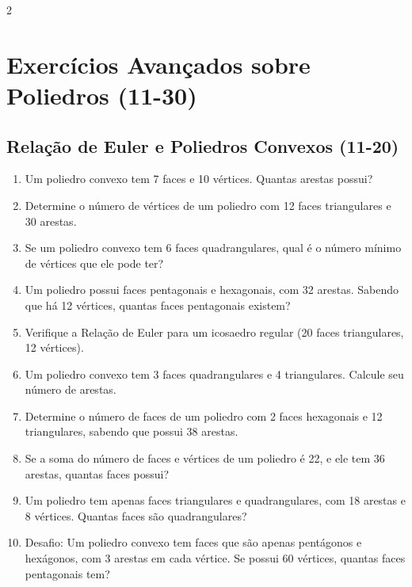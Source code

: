 \documentclass[11pt]{article}
\begin{document}
\begin{multicols}{2}
\section*{Exercícios Avançados sobre Poliedros (11-30)}

\subsection*{Relação de Euler e Poliedros Convexos (11-20)}
\begin{enumerate}
    \item Um poliedro convexo tem 7 faces e 10 vértices. Quantas arestas possui?
    
    \item Determine o número de vértices de um poliedro com 12 faces triangulares e 30 arestas.
    
    \item Se um poliedro convexo tem 6 faces quadrangulares, qual é o número mínimo de vértices que ele pode ter?
    
    \item Um poliedro possui faces pentagonais e hexagonais, com 32 arestas. Sabendo que há 12 vértices, quantas faces pentagonais existem?
    
    \item Verifique a Relação de Euler para um icosaedro regular (20 faces triangulares, 12 vértices).
    
    \item Um poliedro convexo tem 3 faces quadrangulares e 4 triangulares. Calcule seu número de arestas.
    
    \item Determine o número de faces de um poliedro com 2 faces hexagonais e 12 triangulares, sabendo que possui 38 arestas.
    
    \item Se a soma do número de faces e vértices de um poliedro é 22, e ele tem 36 arestas, quantas faces possui?
    
    \item Um poliedro tem apenas faces triangulares e quadrangulares, com 18 arestas e 8 vértices. Quantas faces são quadrangulares?
    
    \item Desafio: Um poliedro convexo tem faces que são apenas pentágonos e hexágonos, com 3 arestas em cada vértice. Se possui 60 vértices, quantas faces pentagonais tem?
\end{enumerate}


\end{multicols}
\end{document}
